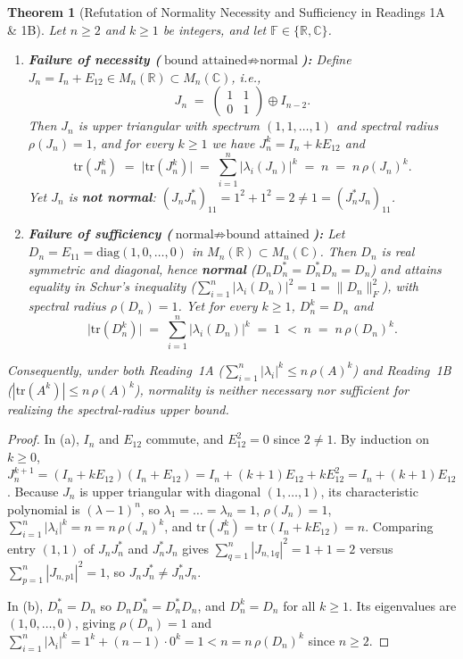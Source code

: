 \documentclass[11pt,a4paper]{article}
\theoremstyle{plain}
\newtheorem{theorem}{Theorem}[section]
\theoremstyle{definition}
\newcommand{\C}{\mathbb{C}}
\newcommand{\R}{\mathbb{R}}
\newcommand{\tr}{\mathrm{tr}}
\newcommand{\diag}{\mathrm{diag}}
\begin{document}
\begin{theorem}[Refutation of Normality Necessity and Sufficiency in Readings 1A \& 1B]\label{thm:refute-reading1}
Let $n \ge 2$ and $k \ge 1$ be integers, and let $\mathbb{F} \in \{\R, \C\}$.
\begin{enumerate}
  \item[(a)] \textbf{Failure of necessity ($\text{bound attained} \not\Rightarrow \text{normal}$):} Define $J_n = I_n + E_{12} \in M_n(\R) \subset M_n(\C)$, i.e.,
  \[
    J_n \;=\; \begin{pmatrix} 1 & 1 \\ 0 & 1 \end{pmatrix} \oplus I_{n-2}.
  \]
  Then $J_n$ is upper triangular with spectrum $(1, 1, \dots, 1)$ and spectral radius $\rho(J_n) = 1$, and for \emph{every} $k \ge 1$ we have $J_n^k = I_n + k E_{12}$ and
  \[
    \tr(J_n^k) \;=\; \bigl|\tr(J_n^k)\bigr| \;=\; \sum_{i=1}^n |\lambda_i(J_n)|^k \;=\; n \;=\; n\,\rho(J_n)^k.
  \]
  Yet $J_n$ is \textbf{not normal}: $(J_n J_n^*)_{11} = 1^2 + 1^2 = 2 \ne 1 = (J_n^* J_n)_{11}$.

  \item[(b)] \textbf{Failure of sufficiency ($\text{normal} \not\Rightarrow \text{bound attained}$):} Let $D_n = E_{11} = \diag(1, 0, \dots, 0)$ in $M_n(\R) \subset M_n(\C)$. Then $D_n$ is real symmetric and diagonal, hence \textbf{normal} ($D_n D_n^* = D_n^* D_n = D_n$) and attains equality in Schur's inequality ($\sum_{i=1}^n |\lambda_i(D_n)|^2 = 1 = \|D_n\|_F^2$), with spectral radius $\rho(D_n) = 1$. Yet for \emph{every} $k \ge 1$, $D_n^k = D_n$ and
  \[
    \bigl|\tr(D_n^k)\bigr| \;=\; \sum_{i=1}^n |\lambda_i(D_n)|^k \;=\; 1 \;<\; n \;=\; n\,\rho(D_n)^k.
  \]
\end{enumerate}
Consequently, under both Reading~1A ($\sum_{i=1}^n |\lambda_i|^k \le n\,\rho(A)^k$) and Reading~1B ($|\tr(A^k)| \le n\,\rho(A)^k$), normality is neither necessary nor sufficient for realizing the spectral-radius upper bound.
\end{theorem}

\begin{proof}
In (a), $I_n$ and $E_{12}$ commute, and $E_{12}^2 = 0$ since $2 \ne 1$. By induction on $k \ge 0$, $J_n^{k+1} = (I_n + k E_{12})(I_n + E_{12}) = I_n + (k+1)E_{12} + k E_{12}^2 = I_n + (k+1)E_{12}$. Because $J_n$ is upper triangular with diagonal $(1,\dots,1)$, its characteristic polynomial is $(\lambda - 1)^n$, so $\lambda_1 = \dots = \lambda_n = 1$, $\rho(J_n) = 1$, $\sum_{i=1}^n |\lambda_i|^k = n = n\,\rho(J_n)^k$, and $\tr(J_n^k) = \tr(I_n + k E_{12}) = n$. Comparing entry $(1,1)$ of $J_n J_n^*$ and $J_n^* J_n$ gives $\sum_{q=1}^n |J_{n,1q}|^2 = 1 + 1 = 2$ versus $\sum_{p=1}^n |J_{n,p1}|^2 = 1$, so $J_n J_n^* \ne J_n^* J_n$.

In (b), $D_n^* = D_n$ so $D_n D_n^* = D_n^* D_n$, and $D_n^k = D_n$ for all $k \ge 1$. Its eigenvalues are $(1, 0, \dots, 0)$, giving $\rho(D_n) = 1$ and $\sum_{i=1}^n |\lambda_i|^k = 1^k + (n-1)\cdot 0^k = 1 < n = n\,\rho(D_n)^k$ since $n \ge 2$.
\end{proof}
\end{document}
